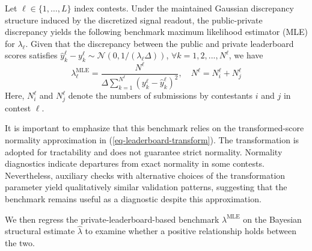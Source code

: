 \documentclass[mnsc]{informs3}
\begin{document}
Let $\ell\in\{1,\ldots,L\}$ index contests.
Under the maintained Gaussian discrepancy structure induced by the discretized signal readout, the public-private discrepancy yields the following benchmark maximum likelihood estimator (MLE) for $\lambda_\ell$.
Given that the discrepancy between the public and private leaderboard scores satisfies $\hat{y}_k^\ell - y_k^\ell \sim \mathcal{N}(0, 1/(\lambda_\ell\Delta))$, $\forall k = 1, 2, ..., N^\ell$, we have
\begin{equation*}
\lambda^{\text{MLE}}_\ell = \frac{N^\ell}{\Delta\sum^{N^\ell}_{k=1}(y_k^\ell - \hat{y}_k^\ell)^2}, \quad N^\ell = N^\ell_i + N^\ell_j
\end{equation*}
Here, $N^\ell_i$ and $N^\ell_j$ denote the numbers of submissions by contestants $i$ and $j$ in contest $\ell$.

It is important to emphasize that this benchmark relies on the transformed-score normality approximation in (\ref{eq-leaderboard-transform}).
The transformation is adopted for tractability and does not guarantee strict normality. Normality diagnostics indicate departures from exact normality in some contests. Nevertheless, auxiliary checks with alternative choices of the transformation parameter yield qualitatively similar validation patterns, suggesting that the benchmark remains useful as a diagnostic despite this approximation.

We then regress the private-leaderboard-based benchmark $\lambda^{\text{MLE}}$ on the Bayesian structural estimate $\hat\lambda$ to examine whether a positive relationship holds between the two.
\end{document}
